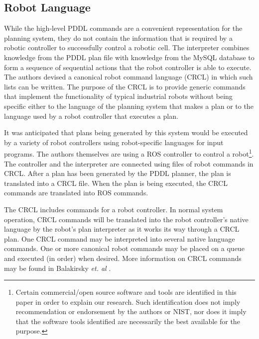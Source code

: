 \subsection{Robot Language}
While the high-level PDDL commands are a convenient representation
for the planning system, they do not contain the information that is
required by a robotic controller to successfully control a robotic cell.
The interpreter combines knowledge from the PDDL plan file with
knowledge from the MySQL database to form a sequence of sequential
actions that the robot controller is able to execute.
The authors devised a canonical robot
command language (CRCL) in which such lists can be written. The purpose of the
CRCL is to provide generic commands that
implement the functionality of typical industrial robots without being
specific either to the language of the planning system that makes a plan or
to the language used by a robot controller that executes a plan.

It was anticipated
that plans being generated by this system would
be executed by a variety of robot controllers using
robot-specific languages for input programs. The authors themselves are
using a ROS controller \cite{ROS} to control a
robot\footnote{Certain commercial/open source software and tools are identified
in this paper in order to explain our research. Such identification does not imply
recommendation or endorsement by the authors or NIST, nor does it
imply that the software tools identified are necessarily the best available for the purpose.}.
The controller and the interpreter are connected using files of robot commands in CRCL. After a plan
has been generated by the PDDL planner, the plan is translated into a CRCL
file. When the plan is being executed, the CRCL commands are translated
into ROS commands.

The CRCL includes commands for a robot controller. In normal system operation,
CRCL commands will be translated into the robot controller's native
language by the robot's plan interpreter as it works its way through a
CRCL plan. One CRCL command may be interpreted into several native
language commands.
One or more canonical robot commands may be placed on a queue and
executed (in order) when desired.
More information on CRCL commands may be found in
Balakirsky \textit{et. al} \cite{Balakirsky2012-1}.
